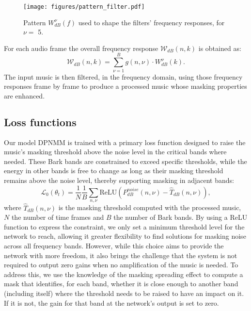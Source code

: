 \begin{figure}
    \centering
    \texttt{[image: figures/pattern\_filter.pdf]}
    \caption{Pattern $W_{dB}^\nu(f)$ used to shape the filters' frequency responses, for $\nu =$ 5.}\vspace{-0.3cm}
    \label{fig:pattern_filter}
\end{figure}
For each audio frame the overall frequency response $\mathcal{W}_{dB}(n,k)$ is obtained as:
\begin{equation}
    \mathcal{W}_{dB}(n,k) = \sum_{\nu=1}^{B} g(n,\nu) \cdot W_{dB}^\nu(k).
\end{equation}
The input music is then filtered, in the frequency domain, using those frequency responses frame by frame to produce a processed music whose masking properties are enhanced.

\subsection{Loss functions}
Our model DPNMM is trained with a primary loss function designed to raise the music's masking threshold above the noise level in the critical bands where needed. These Bark bands are constrained to exceed specific thresholds, while the energy in other bands is free to change as long as their masking threshold remains above the noise level, thereby supporting masking in adjacent bands: 
\begin{equation}
    \mathcal{L}_0 (\theta_t) = \frac{1}{N} \frac{1}{B}  \sum_{n,\nu} \text{ReLU}\left( P_{dB}^{noise}(n,\nu) - \hat{T}_{dB}(n,\nu) \right) ,
\end{equation}
where $\hat{T}_{dB}(n,\nu)$ is the masking threshold computed with the processed music, $N$ the number of time frames and $B$ the number of Bark bands.
By using a ReLU function to express the constraint, we only set a minimum threshold level for the network to reach, allowing it greater flexibility to find solutions for masking noise across all frequency bands. However, while this choice aims to provide the network with more freedom, it also brings the challenge that the system is not required to output zero gains when no amplification of the music is needed. To address this, we use the knowledge of the masking spreading effect  to compute a mask that identifies, for each band, whether it is close enough to another band (including itself) where the threshold needs to be raised to have an impact on it. If it is not, the gain for that band at the network's output is set to zero.

